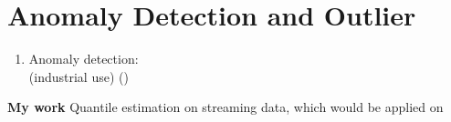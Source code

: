 \documentclass[12pt]{article}
\begin{document}
\section{Anomaly Detection and Outlier}

\begin{enumerate}
    \item Anomaly detection: \\
        \cite{emmottMetaAnalysisAnomalyDetection2015}
        (industrial use)
        ()
\end{enumerate}
\newpage
\textbf{My work} Quantile estimation on streaming data, which would be applied on 

\newpage


\end{document}
